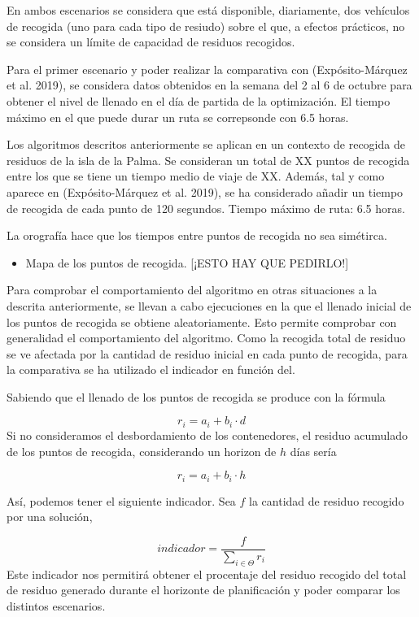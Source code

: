 \documentclass[
]{article}
\providecommand{\tightlist}{%
  \setlength{\itemsep}{0pt}\setlength{\parskip}{0pt}}
\begin{document}
En ambos escenarios se considera que está disponible, diariamente, dos
vehículos de recogida (uno para cada tipo de resiudo) sobre el que, a
efectos prácticos, no se considera un límite de capacidad de residuos
recogidos.

Para el primer escenario y poder realizar la comparativa con
(Expósito-Márquez et al. 2019), se considera datos obtenidos en la
semana del 2 al 6 de octubre para obtener el nivel de llenado en el día
de partida de la optimización. El tiempo máximo en el que puede durar un
ruta se correpsonde con 6.5 horas.

Los algoritmos descritos anteriormente se aplican en un contexto de
recogida de residuos de la isla de la Palma. Se consideran un total de
XX puntos de recogida entre los que se tiene un tiempo medio de viaje de
XX. Además, tal y como aparece en (Expósito-Márquez et al. 2019), se ha
considerado añadir un tiempo de recogida de cada punto de 120 segundos.
Tiempo máximo de ruta: 6.5 horas.

La orografía hace que los tiempos entre puntos de recogida no sea
simétirca.

\begin{itemize}
\tightlist
\item
  Mapa de los puntos de recogida. {[}¡ESTO HAY QUE PEDIRLO!{]}
\end{itemize}

Para comprobar el comportamiento del algoritmo en otras situaciones a la
descrita anteriormente, se llevan a cabo ejecuciones en la que el
llenado inicial de los puntos de recogida se obtiene aleatoriamente.
Esto permite comprobar con generalidad el comportamiento del algoritmo.
Como la recogida total de residuo se ve afectada por la cantidad de
residuo inicial en cada punto de recogida, para la comparativa se ha
utilizado el indicador en función del.

Sabiendo que el llenado de los puntos de recogida se produce con la
fórmula

\[
r_i = a_i + b_i\cdot d
\] Si no consideramos el desbordamiento de los contenedores, el residuo
acumulado de los puntos de recogida, considerando un horizon de \(h\)
días sería

\[
r_i = a_i + b_i\cdot h
\]

Así, podemos tener el siguiente indicador. Sea \(f\) la cantidad de
residuo recogido por una solución,

\[
indicador = \frac{f}{\sum_{i\in\Theta} r_i}
\] Este indicador nos permitirá obtener el procentaje del residuo
recogido del total de residuo generado durante el horizonte de
planificación y poder comparar los distintos escenarios.
\end{document}
